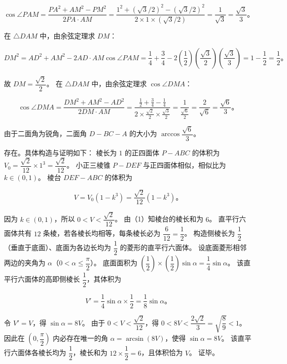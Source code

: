 \begin{answer}
\nopagebreak[4]
\[
\cos\angle PAM = \dfrac{PA^2 + AM^2 - PM^2}{2 PA \cdot AM} = \dfrac{1^2 + (\sqrt{3}/2)^2 - (\sqrt{3}/2)^2}{2 \times 1 \times (\sqrt{3}/2)} = \dfrac{1}{\sqrt{3}} = \dfrac{\sqrt{3}}{3}\mbox{。}
\]

在 $\triangle DAM$ 中，由余弦定理求 $DM$：

\nopagebreak[4]
\[
DM^2 = AD^2 + AM^2 - 2 AD \cdot AM \cos\angle PAM = \dfrac{1}{4} + \dfrac{3}{4} - 2\left(\dfrac{1}{2}\right)\left(\dfrac{\sqrt{3}}{2}\right)\left(\dfrac{\sqrt{3}}{3}\right) = 1 - \dfrac{1}{2} = \dfrac{1}{2}\mbox{。}
\]

故 $DM = \dfrac{\sqrt{2}}{2}$。
在 $\triangle DAM$ 中，由余弦定理求 $\cos\angle DMA$：

\nopagebreak[4]
\[
\cos\angle DMA = \dfrac{DM^2 + AM^2 - AD^2}{2 DM \cdot AM} = \dfrac{\frac{1}{2} + \frac{3}{4} - \frac{1}{4}}{2 \times \frac{\sqrt{2}}{2} \times \frac{\sqrt{3}}{2}} = \dfrac{1}{\frac{\sqrt{6}}{2}} = \dfrac{2}{\sqrt{6}} = \dfrac{\sqrt{6}}{3}\mbox{。}
\]

由于二面角为锐角，二面角 $D - BC - A$ 的大小为 $\arccos\dfrac{\sqrt{6}}{3}$。


存在。具体构造与证明如下：
棱长为 $1$ 的正四面体 $P - ABC$ 的体积为 $V_0 = \dfrac{\sqrt{2}}{12} \times 1^3 = \dfrac{\sqrt{2}}{12}$。
小正三棱锥 $P - DEF$ 与正四面体相似，相似比为 $k \in (0, 1)$。
棱台 $DEF - ABC$ 的体积为

\nopagebreak[4]
\[
V = V_0(1 - k^3) = \dfrac{\sqrt{2}}{12}(1 - k^3)\mbox{。}
\]

因为 $k \in (0, 1)$，所以 $0 < V < \dfrac{\sqrt{2}}{12}$。
由（1）知棱台的棱长和为 $6$。
直平行六面体共有 $12$ 条棱，若各棱长均相等，每条棱长必为 $\dfrac{6}{12} = \dfrac{1}{2}$。
构造侧棱长为 $\dfrac{1}{2}$（垂直于底面）、底面为各边长均为 $\dfrac{1}{2}$ 的菱形的直平行六面体。
设底面菱形相邻两边的夹角为 $\alpha$（$0 < \alpha \leqslant \dfrac{\pi}{2}$）。
底面面积为 $\left(\dfrac{1}{2}\right) \times \left(\dfrac{1}{2}\right) \sin\alpha = \dfrac{1}{4}\sin\alpha$。
该直平行六面体的高即侧棱长 $\dfrac{1}{2}$，其体积为

\nopagebreak[4]
\[
V' = \dfrac{1}{4}\sin\alpha \times \dfrac{1}{2} = \dfrac{1}{8}\sin\alpha\mbox{。}
\]

令 $V' = V$，得 $\sin\alpha = 8V$。
由于 $0 < V < \dfrac{\sqrt{2}}{12}$，得 $0 < 8V < \dfrac{2\sqrt{2}}{3} = \sqrt{\dfrac{8}{9}} < 1$。
因此在 $\left(0, \dfrac{\pi}{2}\right)$ 内必存在唯一的角 $\alpha = \arcsin(8V)$，使得 $\sin\alpha = 8V$。
该直平行六面体各棱长均为 $\dfrac{1}{2}$，棱长和为 $12 \times \dfrac{1}{2} = 6$，且体积恰为 $V$。
证毕。




\end{answer}
